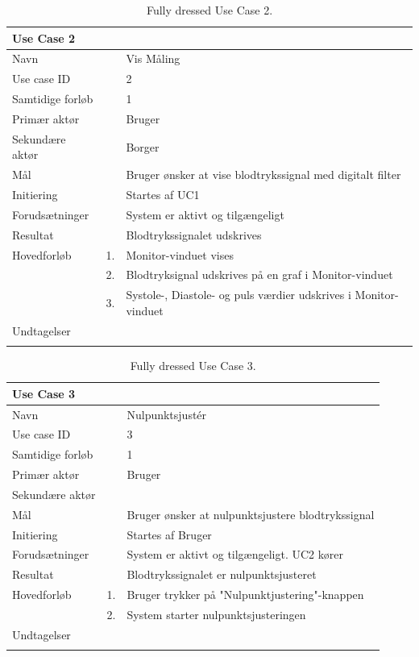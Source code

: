 \begin{longtabu} to  %
    {\large \textbf{Use Case 2}} && \\
    \toprule
    Navn &&    Vis Måling\\
    Use case ID &&    2\\
    Samtidige forløb &&    1\\
    Primær aktør &&    Bruger\\
    Sekundære aktør &&	 Borger\\
    Mål &&    Bruger ønsker at vise blodtrykssignal med digitalt filter\\
    Initiering &&	Startes af UC1\\
    Forudsætninger &&  System er aktivt og tilgængeligt\\
    Resultat &&		Blodtrykssignalet udskrives                         \\ \midrule
    Hovedforløb &    1. &    Monitor-vinduet vises\\[-1ex]	
    			&    2. &    Blodtryksignal udskrives på en graf i 	  Monitor-vinduet\\[-1ex]
    			&	 3.	&	 Systole-, Diastole- og puls	værdier udskrives i Monitor-vinduet\newline\\ \midrule
                
    Undtagelser &    &   \\ \bottomrule
\caption{Fully dressed Use Case 2.}
\label{UC2}
\end{longtabu}


\begin{longtabu} to  %
    {\large \textbf{Use Case 3}} && \\
    \toprule
    Navn &&    Nulpunktsjustér\\
    Use case ID &&    3\\
    Samtidige forløb &&    1\\
    Primær aktør &&    Bruger\\
    Sekundære aktør && \\
    Mål &&    Bruger ønsker at nulpunktsjustere blodtrykssignal\\
    Initiering &&	Startes af Bruger\\
    Forudsætninger &&  System er aktivt og tilgængeligt. UC2 kører \\    Resultat &&		Blodtrykssignalet er nulpunktsjusteret\\ \midrule
    Hovedforløb &    1. &    Bruger trykker på "Nulpunktjustering"\--knappen\\[-1ex]   						 	
                &    2. &    System starter nulpunktsjusteringen\newline\\ \midrule
                
    Undtagelser &     &      \\ \bottomrule
\caption{Fully dressed Use Case 3.}
\label{UC3}
\end{longtabu}

